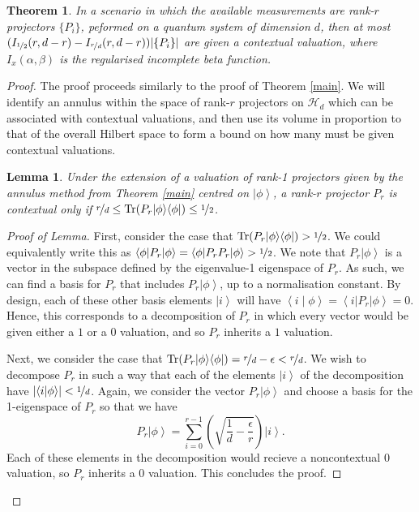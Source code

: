 \documentclass{amsart}
\newtheorem{thm}{Theorem}
\newtheorem{lem}{Lemma}
\theoremstyle{definition}
\DeclareMathOperator{\tr}{Tr}
\newcommand{\ket}[1]{{\left\vert{#1}\right\rangle}}
\newcommand{\bra}[1]{{\left\langle{#1}\right\vert}}
\newcommand{\braket}[2]{{\left< {#1} \middle\vert {#2}\right>}}
\newcommand{\ketbra}[1]{{\left\vert {#1}\middle\rangle\middle\langle{#1}\right\vert}}
\newcommand{\sprod}[2]{\left|\left< {#1} \middle| {#2} \right>\right|}
\begin{document}
\begin{thm}
In a scenario in which the available measurements are rank-$r$ projectors $\{P_i\}$, peformed on a quantum system of dimension $d$, then at most $(I_{\nicefrac{1}{2}}(r,d-r)-I_{\nicefrac{r}{d}}(r,d-r))|\{P_i\}|$ are given a contextual valuation, where $I_x(\alpha,\beta)$ is the \emph{regularised incomplete beta function}.
\end{thm}
\begin{proof}
The proof proceeds similarly to the proof of Theorem \ref{main}. We will identify an annulus within the space of rank-$r$ projectors on $\mathcal{H}_d$ which can be associated with contextual valuations, and then use its volume in proportion to that of the overall Hilbert space to form a bound on how many must be given contextual valuations.
\begin{lem}
Under the extension of a valuation of rank-1 projectors given by the annulus method from Theorem \ref{main} centred on $\ket{\phi}$, a rank-$r$ projector $P_r$ is contextual only if $\nicefrac{r}{d}\leq \tr(P_r\ketbra{\phi})\leq\nicefrac12$.
\end{lem}%
\begin{proof}[Proof of Lemma]

First, consider the case that $\tr(P_r\ketbra{\phi})>\nicefrac12$. We could equivalently write this as $\bra{\phi}P_r\ket\phi=\bra{\phi}P_rP_r\ket\phi>\nicefrac12$. We note that $P_r\ket\phi$ is a vector in the subspace defined by the eigenvalue-1 eigenspace of $P_r$. As such, we can find a basis for $P_r$ that includes $P_r\ket\phi$, up to a normalisation constant. By design, each of these other basis elements $\ket{i}$ will have $\braket{i}{\phi}=\bra{i}P_r\ket{\phi}=0$. Hence, this corresponds to a decomposition of $P_r$ in which every vector would be given either a $1$ or a $0$ valuation, and so $P_r$ inherits a $1$ valuation.

Next, we consider the case that $\tr(P_r\ketbra{\phi})=\nicefrac{r}{d}-\epsilon<\nicefrac{r}{d}$. We wish to decompose $P_r$ in such a way that each of the elements $\ket{i}$ of the decomposition have $\sprod{i}{\phi}<\nicefrac1d$. Again, we consider the vector $P_r\ket\phi$ and choose a basis for the 1-eigenspace of $P_r$ so that we have
\begin{equation}
P_r\ket\phi=\sum_{i=0}^{r-1}\left(\sqrt{\frac1d-\frac{\epsilon}{r}}\right)\ket{i}.
\end{equation}
Each of these elements in the decomposition would recieve a noncontextual 0 valuation, so $P_r$ inherits a 0 valuation. This concludes the proof.
\end{proof}


\end{proof}
\end{document}
